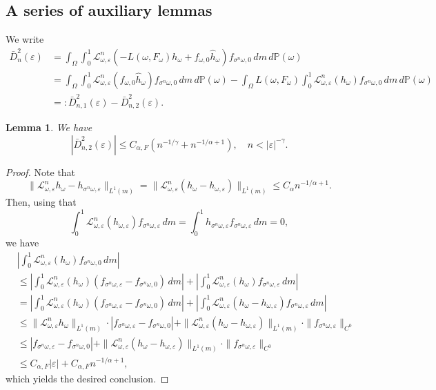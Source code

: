 \documentclass[12pt,reqno,a4paper]{article}
\newtheorem{lemma}[theorem]{Lemma}
\begin{document}
\subsection{A series of auxiliary lemmas}
We write
\begin{equation}\label{8:41}
	\begin{split}
		\bar D_n^2(\varepsilon) &=\int_\Omega \int_0^1\mathcal L_{\omega, \varepsilon}^n(-L(\omega, F_\omega)h_\omega+f_{\omega,0}\hat h_\omega)f_{\sigma^n \omega, 0}\, dm\, d\mathbb P(\omega)\\
		&=\int_\Omega \int_0^1 \mathcal L_{\omega, \varepsilon}^n (f_{\omega, 0}\hat h_\omega)f_{\sigma^n \omega, 0}\, dm\, d\mathbb P(\omega)-\int_\Omega L(\omega, F_\omega) \int_0^1 \mathcal L_{\omega, \varepsilon}^n (h_\omega)f_{\sigma^n \omega, 0}\, dm\, d\mathbb P(\omega)\\
		&=: \bar D_{n, 1}^2(\varepsilon)-\bar D_{n, 2}^2(\varepsilon).
	\end{split}
\end{equation}
\begin{lemma}\label{lem:aux1}
	We have
	\[
	|\bar D_{n, 2}^2(\varepsilon)|\le C_{\alpha, F}(n^{-1/\gamma}+n^{-1/\alpha+1}), \quad n<|\varepsilon|^{-\gamma}.
	\]
\end{lemma}
\begin{proof}
	Note that 
	\[
	\|\mathcal L_{\omega, \varepsilon}^n h_\omega -h_{\sigma^n \omega, \varepsilon}\|_{L^1(m)}=\|\mathcal L_{\omega, \varepsilon}^n (h_\omega-h_{\omega, \varepsilon})\|_{L^1(m)}\le C_\alpha n^{-1/\alpha+1}.
	\]
	Then, using that 
	\[
	\int_0^1 \mathcal L_{\omega, \varepsilon}^n (h_{\omega, \varepsilon})f_{\sigma^n \omega, \varepsilon}\, dm=\int_0^1 h_{\sigma^n \omega, \varepsilon}f_{\sigma^n \omega, \varepsilon}\, dm=0,
	\]
	we have 
	\[
	\begin{split}
		&\left |\int_0^1 \mathcal L_{\omega, \varepsilon}^n(h_\omega)f_{\sigma^n \omega, 0}\, dm\right | \\
		&\le \left |\int_0^1 \mathcal L_{\omega, \varepsilon}^n(h_\omega)(f_{\sigma^n \omega, \varepsilon}-f_{\sigma^n \omega, 0})\, dm\right |+\left |\int_0^1 \mathcal L_{\omega, \varepsilon}^n (h_\omega)f_{\sigma^n \omega, \varepsilon}\, dm\right | \\
		&=\left |\int_0^1 \mathcal L_{\omega, \varepsilon}^n(h_\omega)(f_{\sigma^n \omega, \varepsilon}-f_{\sigma^n \omega, 0})\, dm\right |+\left |\int_0^1 \mathcal L_{\omega, \varepsilon}^n (h_\omega-h_{\omega, \varepsilon})f_{\sigma^n \omega, \varepsilon}\, dm\right | \\
		&\le \|\mathcal L_{\omega, \varepsilon}^n h_\omega \|_{L^1(m)}\cdot \left |f_{\sigma^n \omega, \varepsilon}-f_{\sigma^n \omega, 0}\right |+\|\mathcal L_{\omega, \varepsilon}^n(h_\omega-h_{\omega, \varepsilon})\|_{L^1(m)}\cdot \|f_{\sigma^n \omega, \varepsilon}\|_{C^0} \\
		&\le  \left |f_{\sigma^n \omega, \varepsilon}-f_{\sigma^n \omega, 0}\right |+\|\mathcal L_{\omega, \varepsilon}^n(h_\omega-h_{\omega, \varepsilon})\|_{L^1(m)}\cdot \|f_{\sigma^n \omega, \varepsilon}\|_{C^0} \\
		&\le C_{\alpha, F}|\varepsilon|+C_{\alpha, F}n^{-1/\alpha+1},
	\end{split}
	\]
	which yields the desired conclusion.
\end{proof}
\end{document}

